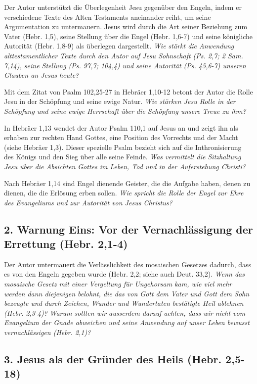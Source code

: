\documentclass[headsepline=true]{book}
\begin{document}
Der Autor unterstützt die Überlegenheit Jesu gegenüber den Engeln, indem
er verschiedene Texte des Alten Testaments aneinander reiht, um seine
Argumentation zu untermauern. Jesus wird durch die Art seiner Beziehung
zum Vater (Hebr. 1,5), seine Stellung über die Engel (Hebr. 1,6-7) und
seine königliche Autorität (Hebr. 1,8-9) als überlegen dargestellt.
\emph{Wie stärkt die Anwendung alttestamentlicher Texte durch den Autor
auf Jesu Sohnschaft (Ps. 2,7; 2 Sam. 7,14), seine Stellung (Ps. 97,7;
104,4) und seine Autorität (Ps. 45,6-7) unseren Glauben an Jesus heute?}

Mit dem Zitat von Psalm 102,25-27 in Hebräer 1,10-12 betont der Autor
die Rolle Jesu in der Schöpfung und seine ewige Natur. \emph{Wie stärken
Jesu Rolle in der Schöpfung und seine ewige Herrschaft über die
Schöpfung unsere Treue zu ihm?}

In Hebräer 1,13 wendet der Autor Psalm 110,1 auf Jesus an und zeigt ihn
als erhaben zur rechten Hand Gottes, eine Position des Vorrechts und der
Macht (siehe Hebräer 1,3). Dieser spezielle Psalm bezieht sich auf die
Inthronisierung des Königs und den Sieg über alle seine Feinde.
\emph{Was vermittelt die Sitzhaltung Jesu über die Absichten Gottes im
Leben, Tod und in der Auferstehung Christi?}

Nach Hebräer 1,14 sind Engel dienende Geister, die die Aufgabe haben,
denen zu dienen, die die Erlösung erben sollen. \emph{Wie spricht die
Rolle der Engel zur Ehre des Evangeliums und zur Autorität von Jesus
Christus?}

\subsection{2. Warnung Eins: Vor der Vernachlässigung der Errettung
(Hebr.
2,1-4)}\label{warnung-eins-vor-der-vernachluxe4ssigung-der-errettung-hebr.-21-4}

Der Autor untermauert die Verlässlichkeit des mosaischen Gesetzes
dadurch, dass es von den Engeln gegeben wurde (Hebr. 2,2; siehe auch
Deut. 33,2). \emph{Wenn das mosaische Gesetz mit einer Vergeltung für
Ungehorsam kam, wie viel mehr werden dann diejenigen belohnt, die das
von Gott dem Vater und Gott dem Sohn bezeugte und durch Zeichen, Wunder
und Wundertaten bestätigte Heil ablehnen (Hebr. 2,3-4)?} \emph{Warum
sollten wir ausserdem darauf achten, dass wir nicht vom Evangelium der
Gnade abweichen und seine Anwendung auf unser Leben bewusst
vernachlässigen (Hebr. 2,1)?}

\subsection{3. Jesus als der Gründer des Heils (Hebr.
2,5-18)}\label{jesus-als-der-gruxfcnder-des-heils-hebr.-25-18}
\end{document}
